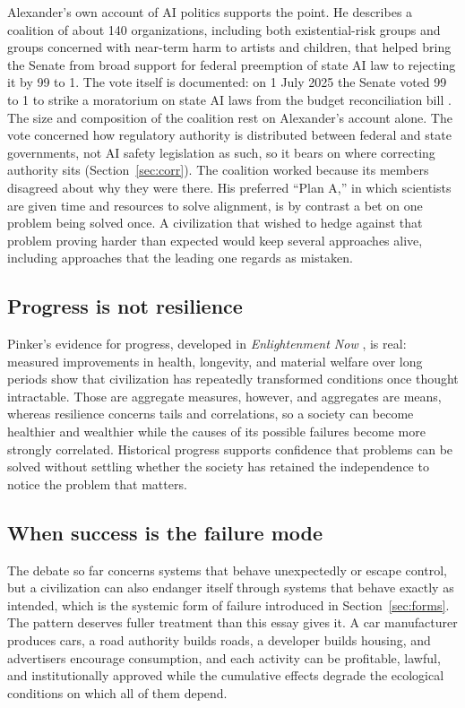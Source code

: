 \documentclass[11pt]{article}
\begin{document}
Alexander's own account of AI politics supports the point. He describes a coalition of about 140 organizations, including both existential-risk groups and groups concerned with near-term harm to artists and children, that helped bring the Senate from broad support for federal preemption of state AI law to rejecting it by 99 to 1. The vote itself is documented: on 1 July 2025 the Senate voted 99 to 1 to strike a moratorium on state AI laws from the budget reconciliation bill \cite{senate2025}. The size and composition of the coalition rest on Alexander's account alone. The vote concerned how regulatory authority is distributed between federal and state governments, not AI safety legislation as such, so it bears on where correcting authority sits (Section~\ref{sec:corr}). The coalition worked because its members disagreed about why they were there. His preferred ``Plan A,'' in which scientists are given time and resources to solve alignment, is by contrast a bet on one problem being solved once. A civilization that wished to hedge against that problem proving harder than expected would keep several approaches alive, including approaches that the leading one regards as mistaken.

\subsection{Progress is not resilience}

Pinker's evidence for progress, developed in \emph{Enlightenment Now} \cite{pinker2018}, is real: measured improvements in health, longevity, and material welfare over long periods show that civilization has repeatedly transformed conditions once thought intractable. Those are aggregate measures, however, and aggregates are means, whereas resilience concerns tails and correlations, so a society can become healthier and wealthier while the causes of its possible failures become more strongly correlated. Historical progress supports confidence that problems can be solved without settling whether the society has retained the independence to notice the problem that matters.

\subsection{When success is the failure mode}\label{sec:success}

The debate so far concerns systems that behave unexpectedly or escape control, but a civilization can also endanger itself through systems that behave exactly as intended, which is the systemic form of failure introduced in Section~\ref{sec:forms}. The pattern deserves fuller treatment than this essay gives it. A car manufacturer produces cars, a road authority builds roads, a developer builds housing, and advertisers encourage consumption, and each activity can be profitable, lawful, and institutionally approved while the cumulative effects degrade the ecological conditions on which all of them depend.
\end{document}
